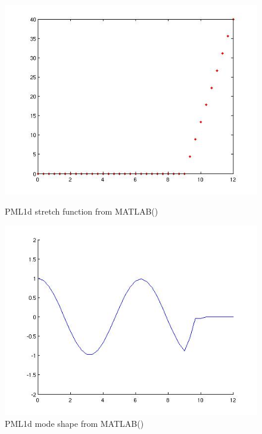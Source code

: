 \begin{figure}[htbp]
\begin{minipage}{0.45\linewidth}
    \includegraphics[width=\linewidth]{fig/pml1d_stretch40_matlab.jpg}
    \caption{PML1d stretch function from MATLAB()}
    \label{fig:PML1dStretchFunction40MATLAB}
  \end{minipage}
  \hfill
  \begin{minipage}{0.45\linewidth}
    \includegraphics[width=\linewidth]{fig/pml1d_mode40_matlab.jpg}
    \caption{PML1d mode shape from MATLAB()}
    \label{fig:PML1dModeShape40MATLAB}
  \end{minipage}
  \begin{minipage}{0.45\linewidth}

\end{minipage}
\end{figure}
